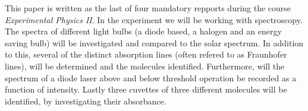 This paper is written as the last of four mandatory repports during the course
\emph{Experimental Physics II}. In the experiment we will be working with
spectroscopy. The spectra of different light bulbs (a diode based, a halogen
and an energy saving bulb) will be investigated and compared to the solar
spectrum. In addition to this, several of the distinct absorption lines (often
refered to as Fraunhofer lines), will be determined and the molecules
identified. Furthermore, will the spectrum of a diode laser above and below
threshold operation be recorded as a function of intensity. Lastly three
cuvettes of three different molecules will be identified, by investigating
their absorbance.
